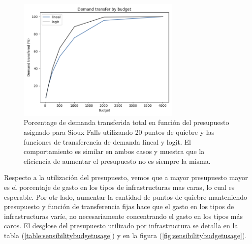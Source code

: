 \documentclass{article}
\begin{document}
  \begin{figure}[h!]
    \centering
    \includegraphics[width=8cm]{../resources/demand_by_budget.png}
      \caption{Porcentage de demanda transferida total en función del presupuesto asignado para Sioux Falls utilizando 20 puntos de quiebre y las funciones de transferencia de demanda lineal y logit. El comportamiento es similar en ambos casos y muestra que la eficiencia de aumentar el presupuesto no es siempre la misma.}
    \label{fig:demandtransferbybudgetlinear}
  \end{figure}

  Respecto a la utilización del presupuesto, vemos que a mayor presupuesto mayor es el porcentaje de gasto en los tipos de infrastructuras mas caras, lo cual es esperable. Por otr lado, aumentar la cantidad de puntos de quiebre manteniendo presupuesto y función de transferencia fijas hace que el gasto en los tipos de infrastructuras varíe, no necesariamente concentrando el gasto en los tipos más caros. El desglose del presupuesto utilizado por infrastructura se detalla en la tabla (\ref{table:sensibilitybudgetusage}) y en la figura (\ref{fig:sensibilitybudgetusage}).
\end{document}
